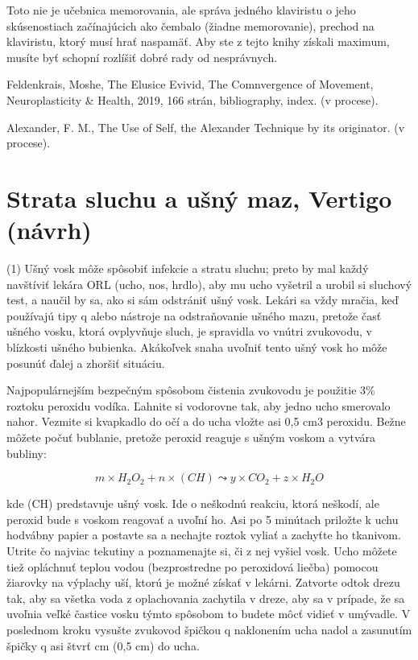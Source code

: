 \documentclass[11pt,a4paper%
]{article}
\begin{document}
Toto nie je učebnica memorovania, ale správa jedného klaviristu o jeho skúsenostiach začínajúcich ako čembalo (žiadne memorovanie), prechod na klaviristu, ktorý musí hrať naspamäť. Aby ste z tejto knihy získali maximum, musíte byť schopní rozlíšiť dobré rady od nesprávnych.

Feldenkrais, Moshe, The Elusice Evivid, The Comnvergence of Movement, Neuroplasticity \& Health, 2019, 166 strán, bibliography, index. (v procese).

Alexander, F. M., The Use of Self, the Alexander Technique by its originator. (v procese). 

\section{Strata sluchu a ušný maz, Vertigo (návrh)}
(1) Ušný vosk môže spôsobiť infekcie a stratu sluchu; preto by mal každý navštíviť lekára ORL (ucho, nos, hrdlo), aby mu ucho vyšetril a urobil si sluchový test, a naučil by sa, ako si sám odstrániť ušný vosk. Lekári sa vždy mračia, keď používajú tipy q alebo nástroje na odstraňovanie ušného mazu, pretože časť ušného vosku, ktorá ovplyvňuje sluch, je spravidla vo vnútri zvukovodu, v blízkosti ušného bubienka. Akákoľvek snaha uvoľniť tento ušný vosk ho môže posunúť ďalej a zhoršiť situáciu.

Najpopulárnejším bezpečným spôsobom čistenia zvukovodu je použitie 3\% roztoku peroxidu vodíka. Ľahnite si vodorovne tak, aby jedno ucho smerovalo nahor. Vezmite si kvapkadlo do očí a do ucha vložte asi 0,5 cm3 peroxidu. Bežne môžete počuť bublanie, pretože peroxid reaguje s ušným voskom a vytvára bubliny:

\begin{equation}
m \times H_2O_2 + n \times (CH) \leadsto y \times CO_2 + z \times H_2O
\end{equation}

kde (CH) predstavuje ušný vosk. Ide o neškodnú reakciu, ktorá neškodí, ale peroxid bude s voskom reagovať a uvoľní ho. Asi po 5 minútach priložte k uchu hodvábny papier a
postavte sa a nechajte roztok vyliať a zachyťte ho tkanivom. Utrite čo najviac tekutiny a poznamenajte si, či z nej vyšiel vosk. Ucho môžete tiež opláchnuť teplou vodou (bezprostredne po
peroxidová liečba) pomocou žiarovky na výplachy uší, ktorú je možné získať v lekárni. Zatvorte odtok drezu tak, aby sa všetka voda z oplachovania zachytila ​​v dreze, aby sa v prípade, že sa uvoľnia veľké častice vosku
týmto spôsobom to budete môcť vidieť v umývadle. V poslednom kroku vysušte zvukovod špičkou q naklonením ucha nadol a zasunutím špičky q asi štvrť cm (0,5 cm) do ucha.
\end{document}
